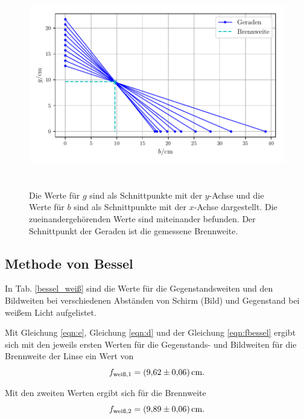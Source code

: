 \begin{figure}
    \centering
    \includegraphics[width=14cm, height=9cm]{build/plot1.pdf}
    \caption{Die Werte für $g$ sind als Schnittpunkte mit der $y$-Achse und die Werte für $b$ sind als Schnittpunkte mit der $x$-Achse dargestellt. Die zueinandergehörenden Werte sind miteinander befunden. Der Schnittpunkt der Geraden ist die gemessene Brennweite.}
    \label{fig:brennweite}
\end{figure}



\subsection{Methode von Bessel}

In Tab. \ref{bessel_weiß} sind die Werte für die Gegenstandsweiten und den Bildweiten bei verschiedenen Abständen von Schirm (Bild) und Gegenstand bei weißem Licht aufgelistet.



\noindent Mit Gleichung \eqref{eqn:e}, Gleichung \eqref{eqn:d} und der Gleichung \eqref{eqn:fbessel} ergibt sich mit den jeweils ersten Werten für die Gegenstands- und Bildweiten für die Brennweite der Linse ein Wert von 
\begin{equation*}
    f_\text{weiß,1} = \SI{9.62 \pm 0.06}{\centi\meter}.
\end{equation*}

\noindent Mit den zweiten Werten ergibt sich für die Brennweite
\begin{equation*}
    f_\text{weiß,2} = \SI{9.89 \pm 0.06}{\centi\meter}.
\end{equation*}

